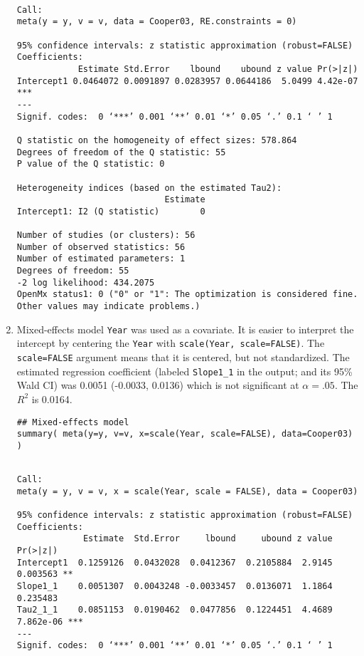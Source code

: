 \documentclass[11pt]{article}
\begin{document}
\begin{enumerate}
\begin{verbatim}

Call:
meta(y = y, v = v, data = Cooper03, RE.constraints = 0)

95% confidence intervals: z statistic approximation (robust=FALSE)
Coefficients:
            Estimate Std.Error    lbound    ubound z value Pr(>|z|)    
Intercept1 0.0464072 0.0091897 0.0283957 0.0644186  5.0499 4.42e-07 ***
---
Signif. codes:  0 ‘***’ 0.001 ‘**’ 0.01 ‘*’ 0.05 ‘.’ 0.1 ‘ ’ 1

Q statistic on the homogeneity of effect sizes: 578.864
Degrees of freedom of the Q statistic: 55
P value of the Q statistic: 0

Heterogeneity indices (based on the estimated Tau2):
                             Estimate
Intercept1: I2 (Q statistic)        0

Number of studies (or clusters): 56
Number of observed statistics: 56
Number of estimated parameters: 1
Degrees of freedom: 55
-2 log likelihood: 434.2075 
OpenMx status1: 0 ("0" or "1": The optimization is considered fine.
Other values may indicate problems.)
\end{verbatim}

\item Mixed-effects model
\label{sec:org64bda5c}
\texttt{Year} was used as a covariate. It is easier to interpret the intercept by centering the \texttt{Year} with \texttt{scale(Year, scale=FALSE)}. The \texttt{scale=FALSE} argument means that it is centered, but not standardized. The estimated regression coefficient (labeled \texttt{Slope1\_1} in the output; and its 95\% Wald CI) was 0.0051 (-0.0033, 0.0136) which is not significant at \(\alpha=.05\). The \(R^2\) is 0.0164. 
\begin{verbatim}
## Mixed-effects model
summary( meta(y=y, v=v, x=scale(Year, scale=FALSE), data=Cooper03) )
\end{verbatim}

\begin{verbatim}

Call:
meta(y = y, v = v, x = scale(Year, scale = FALSE), data = Cooper03)

95% confidence intervals: z statistic approximation (robust=FALSE)
Coefficients:
             Estimate  Std.Error     lbound     ubound z value  Pr(>|z|)    
Intercept1  0.1259126  0.0432028  0.0412367  0.2105884  2.9145  0.003563 ** 
Slope1_1    0.0051307  0.0043248 -0.0033457  0.0136071  1.1864  0.235483    
Tau2_1_1    0.0851153  0.0190462  0.0477856  0.1224451  4.4689 7.862e-06 ***
---
Signif. codes:  0 ‘***’ 0.001 ‘**’ 0.01 ‘*’ 0.05 ‘.’ 0.1 ‘ ’ 1


\end{verbatim}
\end{enumerate}
\end{document}
